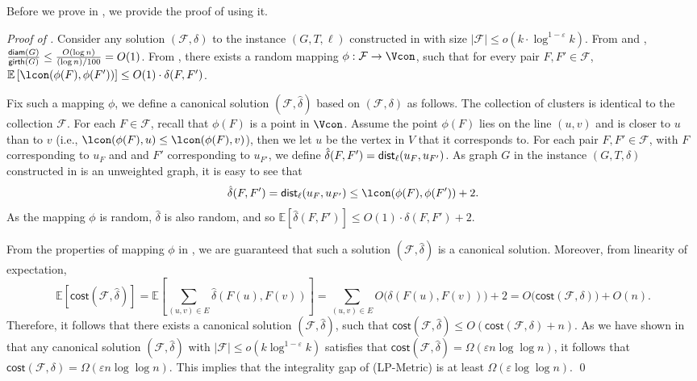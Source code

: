 \documentclass[11pt]{article}
\theoremstyle{definition}
\newcommand{\fset}{{\mathcal{F}}}
\newcommand{\eps}{{\varepsilon}}
\newcommand{\diam}{\textnormal{\textsf{diam}}}
\newcommand{\dist}{\textnormal{\textsf{dist}}}
\newcommand{\gir}{\textnormal{\textsf{girth}}}
\newcommand\vol{\mathsf{cost}}
\def\ex#1{{\mathbb{E}}\left[ #1 \right]}
\begin{document}
\begin{titlepage}
Before we prove  in , we provide the proof of  using it.

\emph{Proof of .}
Consider any solution $(\fset,\delta)$ to the instance $(G,T,\ell)$ constructed in  with size $|\fset|\le o(k\cdot \log^{1-\eps}k)$. 
From  and , $\frac{\diam(G)}{\gir(G)}\le \frac{O(\log n)}{(\log n)/100}=O(1)$. From , there exists a random mapping $\phi: \fset \to \Vcon$, such that for every pair $F,F'\in \fset$,
$\ex{\lcon(\phi(F),\phi(F'))} \le O(1)\cdot  \delta(F,F')$. 

Fix such a mapping $\phi$, we define a canonical solution $(\fset,\hat \delta)$ based on $(\fset,\delta)$ as follows. The collection of clusters is identical to the collection $\fset$. For each $F\in \fset$, recall that $\phi(F)$ is a point in $\Vcon$. Assume the point $\phi(F)$ lies on the line $(u,v)$ and is closer to $u$ than to $v$ (i.e., $\lcon(\phi(F),u)\le\lcon(\phi(F),v)$), then we let $u$ be the vertex in $V$ that it corresponds to. For each pair $F,F'\in \fset$, with $F$ corresponding to $u_F$ and and $F'$ corresponding to $u_{F'}$, we define $\hat\delta(F,F')=\dist_{\ell}(u_F,u_{F'})$. 
As graph $G$ in the instance $(G,T,\delta)$ constructed in  is an unweighted graph, it is easy to see that
\[\hat\delta(F,F')=\dist_{\ell}(u_F,u_{F'})\le \lcon(\phi(F),\phi(F'))+2.\]
As the mapping $\phi$ is random, $\hat{\delta}$ is also random, and so $\ex{\hat\delta(F,F')}\le O(1)\cdot  \delta(F,F') +2$.

From the properties of mapping $\phi$ in , we are guaranteed that such a solution $(\fset,\hat\delta)$ is a canonical solution. Moreover, from linearity of expectation, 
$$\ex{\vol(\fset,\hat\delta)}
=\ex{\sum_{(u,v)\in E}\hat\delta(F(u),F(v))}
=\sum_{(u,v)\in E}O\bigg(\delta(F(u),F(v))\bigg)+2
=O\bigg(\vol(\fset,\delta)\bigg)+O(n).
$$
Therefore, it follows that there exists a canonical solution $(\fset,\hat\delta)$, such that $\vol(\fset,\hat\delta)\le O(\vol(\fset,\delta)+n)$.
As we have shown in  that any canonical solution $(\fset,\hat\delta)$ with $|\fset|\le o(k\log^{1-\eps}k)$ satisfies that $\vol(\fset,\hat\delta)=\Omega(\eps n\log\log n)$, it follows that $\vol(\fset,\delta)=\Omega(\eps n\log\log n)$.
This implies that the integrality gap of (\textsf{LP-Metric}) is at least $\Omega(\eps \log\log n)$.
\qed







\end{titlepage}
\end{document}
